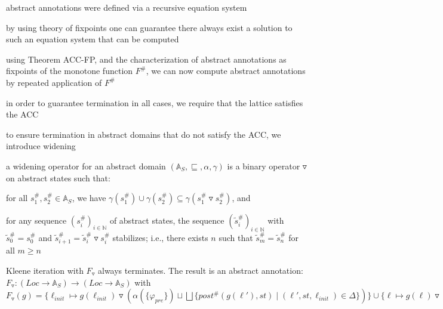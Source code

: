 \documentclass[a4paper]{article}
\begin{document}
\begin{minipage}[t]{0.16\linewidth}
\begin{betterlist}
{{\begin{betterlist}
\begin{betterlist}
					\end{betterlist}
					\item abstract annotations were defined via a recursive equation system
					\item by using theory of fixpoints one can guarantee there always exist a solution to such an equation system that can be computed
					\item using Theorem ACC-FP, and the characterization of abstract annotations as fixpoints of the monotone function $F^\#$, we can now compute abstract annotations by repeated application of $F^\#$
					\begin{betterlist}
						\item in order to guarantee termination in all cases, we require that the lattice satisfies the ACC
					\end{betterlist}
					\item to ensure termination in abstract domains that do not satisfy the ACC, we introduce widening
					\begin{betterlist}
						\item a \alert{widening operator} for an abstract domain $(\mathbb{A}_S, \sqsubseteq, \alpha, \gamma)$ is a binary operator $\triangledown$ on abstract states such that:
						\begin{betterlist}
							\item for all $s^\#_1, s^\#_2 \in \mathbb{A}_S$, we have $\gamma(s^\#_1) \cup \gamma(s^\#_2) \subseteq \gamma(s^\#_1 \triangledown s^\#_2)$, and
							\item for any sequence $(s^\#_i)_{i\in \mathbb{N}}$ of abstract states, the sequence $(\tilde s^\#_i)_{i\in \mathbb{N}}$ with $\tilde s^\#_0 = s^\#_0$ and $\tilde s^\#_{i+1} = \tilde s^\#_i \triangledown s^\#_i$ stabilizes; i.e., there exists $n$ such that $\tilde s^\#_m = \tilde s^\#_n$ for all $m \ge n$
						\end{betterlist}
						\item Kleene iteration with $F_{\triangledown}$ always terminates. The result is an abstract annotation: $F_{\triangledown}: (Loc \rightarrow \mathbb{A}_S) \rightarrow (Loc \rightarrow \mathbb{A}_S)$ with $F_{\triangledown}(g) = \{\ell_{init} \mapsto g(\ell_{init}) \triangledown(\alpha(\{\varphi_{pre}\}) \sqcup \bigsqcup \{post^\#(g(\ell'), st) \mid (\ell', st, \ell_{init}) \in \Delta\})\}\cup \{\ell\mapsto g(\ell) \triangledown \bigsqcup\{post^\#(g(\ell'), st) \mid (\ell', st, \ell) \in \Delta\} \mid \ell \in Loc \setminus \{\ell_{init}\}\}$

\end{betterlist}
\end{betterlist}}}
\end{betterlist}
\end{minipage}
\end{document}
